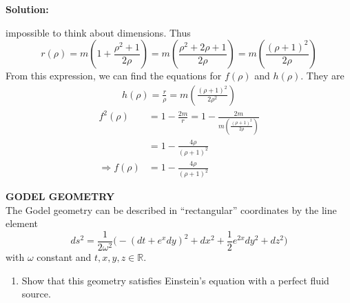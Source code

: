 \documentclass[a4paper, 11pt]{article}
\newcommand{\R}{\mathbb{R}}
\newenvironment{solution}{%
  \noindent\textbf{Solution: }
	\begin{list}{}{%
			\setlength{\topsep}{0pt}%
			\setlength{\leftmargin}{0.5cm}%
			\setlength{\rightmargin}{0.5cm}%
			\setlength{\listparindent}{\parindent}%
			\setlength{\itemindent}{\parindent}%
			\setlength{\parsep}{\parskip}%
		}%
		\item[]}{\end{list}}
\begin{document}
\begin{enumerate}[leftmargin=0em, label=\textbf{\arabic*}.]
\begin{solution}
    impossible to think about dimensions. Thus
    \begin{equation}
      r(\rho) = m\left( 1 + \frac{\rho^2+1}{2\rho} \right) = m\left( \frac{\rho^2+2\rho+1}{2\rho} \right) = m\left( \frac{(\rho+1)^2}{2\rho} \right)
    \end{equation}
    From this expression, we can find the equations for $f(\rho)$ and $h(\rho)$.
    They are
    \begin{align}
      h(\rho) = \frac{r}{\rho} = m\left( \frac{(\rho+1)^2}{2\rho^2} \right)
    \end{align}
    \begin{align}
      f^2(\rho) &= 1-\frac{2m}{r} = 1-\frac{2m}{m\left( \frac{(\rho+1)^2}{2\rho} \right)}  \\
                &= 1-\frac{4\rho}{(\rho+1)^2}\\
      \Rightarrow f(\rho) &= 1-\frac{4\rho}{(\rho+1)^2}
    \end{align}
  \end{solution}

\item \textbf{GODEL GEOMETRY}\\
  The Godel geometry can be described in ``rectangular'' coordinates by the line
  element
  \begin{equation}
    ds^2 = \frac{1}{2\omega^2}\Big( -(dt+e^xdy)^2+dx^2+\frac{1}{2}e^{2x}dy^2+dz^2   \Big)
  \end{equation}
  with $\omega$ constant and $t,x,y,z\in\R$.
  
  \begin{enumerate}[leftmargin=2em, label=(\textbf{\alph*})]
  \item Show that this geometry satisfies Einstein's equation with a perfect
    fluid source.\\
    

\end{enumerate}
\end{enumerate}
\end{document}
